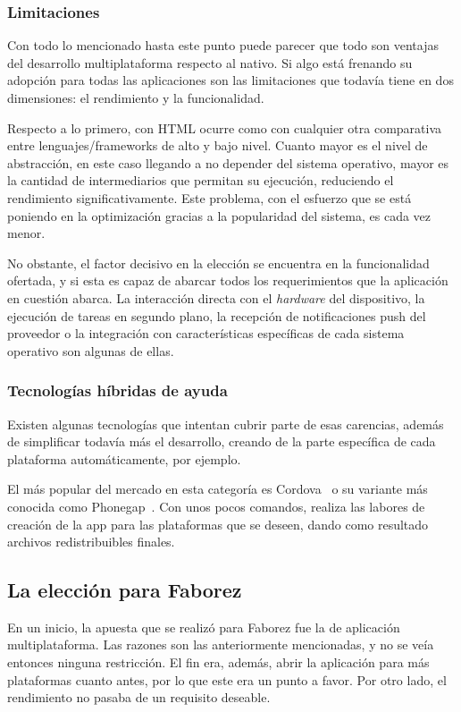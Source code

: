 \documentclass[main]{subfiles}
\begin{document}
\subsubsection{Limitaciones}
Con todo lo mencionado hasta este punto puede parecer que todo son ventajas del desarrollo multiplataforma respecto al nativo. Si algo está frenando su adopción para todas las aplicaciones son las limitaciones que todavía tiene en dos dimensiones: el rendimiento y la funcionalidad.

Respecto a lo primero, con HTML ocurre como con cualquier otra comparativa entre lenguajes/\glspl{framework} de alto y bajo nivel. Cuanto mayor es el nivel de abstracción, en este caso llegando a no depender del sistema operativo, mayor es la cantidad de intermediarios que permitan su ejecución, reduciendo el rendimiento significativamente. Este problema, con el esfuerzo que se está poniendo en la optimización gracias a la popularidad del sistema, es cada vez menor.

No obstante, el factor decisivo en la elección se encuentra en la funcionalidad ofertada, y si esta es capaz de abarcar todos los requerimientos que la aplicación en cuestión abarca. La interacción directa con el \emph{hardware} del dispositivo, la ejecución de tareas en segundo plano, la recepción de notificaciones \gls{push} del proveedor o la integración con características específicas de cada sistema operativo son algunas de ellas.

\subsubsection{Tecnologías híbridas de ayuda}
Existen algunas tecnologías que intentan cubrir parte de esas carencias, además de simplificar todavía más el desarrollo, creando de la parte específica de cada plataforma automáticamente, por ejemplo.

El más popular del mercado en esta categoría es Cordova~\autocite{cordova} o su variante más conocida como Phonegap~\autocite{phonegap}. Con unos pocos comandos, realiza las labores de creación de la \gls{app} para las plataformas que se deseen, dando como resultado archivos redistribuibles finales.

\subsection{La elección para Faborez}
En un inicio, la apuesta que se realizó para Faborez fue la de aplicación multiplataforma. Las razones son las anteriormente mencionadas, y no se veía entonces ninguna restricción. El fin era, además, abrir la aplicación para más plataformas cuanto antes, por lo que este era un punto a favor. Por otro lado, el rendimiento no pasaba de un requisito deseable.
\end{document}
